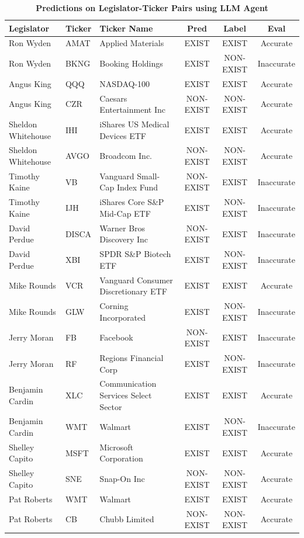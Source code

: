 \documentclass[15pt,letterpaper]{article}
\begin{document}
\begin{table}[ht]
  \centering
  \caption{\textbf{Predictions on Legislator-Ticker Pairs using LLM Agent}}
  \begin{tabular}{|l|l|l|c|c|c|}
  \hline
  \textbf{Legislator} & \textbf{Ticker} & \textbf{Ticker Name} & \textbf{Pred} & \textbf{Label} & \textbf{Eval} \\
  \hline
  Ron Wyden & AMAT & Applied Materials & EXIST & EXIST & Accurate \\
  Ron Wyden & BKNG & Booking Holdings & EXIST & NON-EXIST & Inaccurate \\
  Angus King & QQQ & NASDAQ-100 & EXIST & EXIST & Accurate \\
  Angus King & CZR & Caesars Entertainment Inc & NON-EXIST & NON-EXIST & Accurate \\
  Sheldon Whitehouse & IHI & iShares US Medical Devices ETF & EXIST & EXIST & Accurate \\
  Sheldon Whitehouse & AVGO & Broadcom Inc. & NON-EXIST & NON-EXIST & Accurate \\
  Timothy Kaine & VB & Vanguard Small-Cap Index Fund & NON-EXIST & EXIST & Inaccurate \\
  Timothy Kaine & IJH & iShares Core S\&P Mid-Cap ETF & EXIST & NON-EXIST & Inaccurate \\
  David Perdue & DISCA & Warner Bros Discovery Inc & NON-EXIST & EXIST & Inaccurate \\
  David Perdue & XBI & SPDR S\&P Biotech ETF & EXIST & NON-EXIST & Inaccurate \\
  Mike Rounds & VCR & Vanguard Consumer Discretionary ETF & EXIST & EXIST & Accurate \\
  Mike Rounds & GLW & Corning Incorporated & EXIST & NON-EXIST & Inaccurate \\
  Jerry Moran & FB & Facebook & NON-EXIST & EXIST & Inaccurate \\
  Jerry Moran & RF & Regions Financial Corp & EXIST & NON-EXIST & Inaccurate \\
  Benjamin Cardin & XLC & Communication Services Select Sector & EXIST & EXIST & Accurate \\
  Benjamin Cardin & WMT & Walmart & EXIST & NON-EXIST & Inaccurate \\
  Shelley Capito & MSFT & Microsoft Corporation & EXIST & EXIST & Accurate \\
  Shelley Capito & SNE & Snap-On Inc & NON-EXIST & NON-EXIST & Accurate \\
  Pat Roberts & WMT & Walmart & EXIST & EXIST & Accurate \\
  Pat Roberts & CB & Chubb Limited & NON-EXIST & NON-EXIST & Accurate \\
  \hline
  \end{tabular}
  \label{tab:prediction_analysis}
  \end{table}
\end{document}

